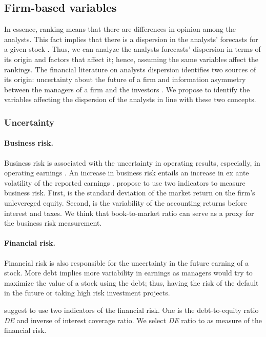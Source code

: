 \subsection{Firm-based variables}

In essence, ranking means that there are differences in opinion among the analysts.  This fact implies that there is  a dispersion in the analysts' forecasts for a given stock \citep{diether2002}. Thus, we can analyze  the analysts forecasts' dispersion in terms of its origin and factors that affect it; hence, assuming the same variables affect the rankings.
The financial literature on analysts dispersion identifies two sources of its origin: uncertainty about the future of a firm  and information asymmetry between the managers of a firm and the investors \citep{barron1998,barron2009}. We propose to identify the variables affecting the dispersion of the analysts in line with these two concepts.

\subsubsection{Uncertainty}

\paragraph{Business risk.} Business risk is associated with the uncertainty in operating results, especially, in operating earnings \citep{hill1980}. An increase in business risk entails an increase in ex ante volatility of the reported earnings \citep{parkash1995}. \cite{parkash1995} propose to use two indicators to measure business risk. First, is the standard deviation of the market return on the firm's unlevereged equity. Second, is the variability of the accounting returns before interest and taxes. We think that  book-to-market ratio can serve as a proxy for the business risk measurement. 

\paragraph{Financial risk.} Financial risk is also responsible for the uncertainty in the future earning of a stock. More debt implies more variability in earnings as managers would try to maximize the value of a stock using the debt; thus, having the risk of the default in the future or taking high risk investment projects. 

\cite{parkash1995} suggest to use two indicators of the financial risk. One is the debt-to-equity ratio \emph{DE} and inverse of interest coverage ratio. We select \emph{DE} ratio to as measure of the financial risk.

